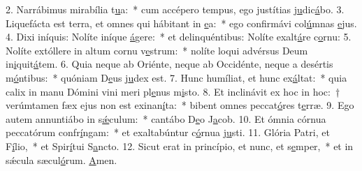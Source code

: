 2. Narrábimus mirabília t\uline{u}a:~* cum accépero tempus, ego justítias j\uline{u}dic\uline{á}bo.
3. Liquefácta est terra, et omnes qui hábitant in \uline{e}a:~* ego confirmávi col\uline{ú}mnas \uline{e}jus.
4. Dixi iníquis: Nolíte iníque \uline{á}gere:~* et delinquéntibus: Nolíte exalt\uline{á}re c\uline{o}rnu:
5. Nolíte extóllere in altum cornu v\uline{e}strum:~* nolíte loqui advérsus Deum in\uline{i}quit\uline{á}tem.
6. Quia neque ab Oriénte, neque ab Occidénte, neque a desértis m\uline{ó}ntibus:~* quóniam D\uline{e}us j\uline{u}dex est.
7. Hunc humíliat, et hunc ex\uline{á}ltat:~* quia calix in manu Dómini vini meri pl\uline{e}nus m\uline{i}sto.
8. Et inclinávit ex hoc in hoc:~† verúmtamen fæx ejus non est exinan\uline{í}ta:~* bibent omnes peccat\uline{ó}res t\uline{e}rræ.
9. Ego autem annuntiábo in s\uline{ǽ}culum:~* cantábo D\uline{e}o J\uline{a}cob.
10. Et ómnia córnua peccatórum confr\uline{í}ngam:~* et exaltabúntur c\uline{ó}rnua j\uline{u}sti.
11. Glória Patri, et F\uline{í}lio,~* et Spir\uline{í}tui S\uline{a}ncto.
12. Sicut erat in princípio, et nunc, et s\uline{e}mper,~* et in sǽcula sæcul\uline{ó}rum. \uline{A}men.

